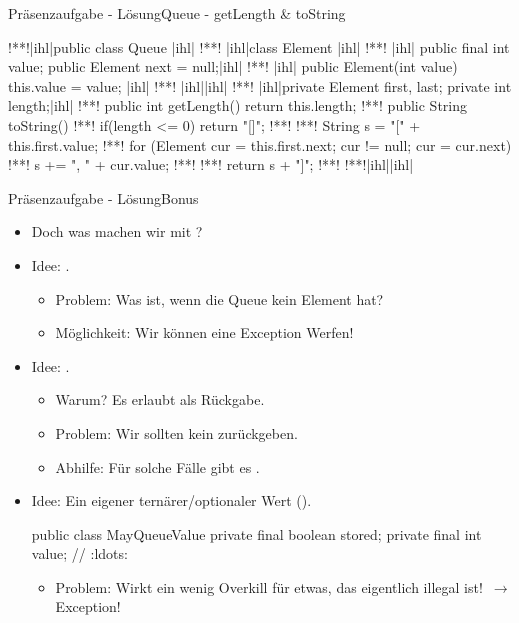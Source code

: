 \begin{frame}[c,fragile]{Präsenzaufgabe - Lösung\hfill Queue - getLength \& toString}
\SetupLstHl{}
\begin{plainjava}
!**!|ihl|public class Queue {|ihl|
!**!    |ihl|class Element {|ihl|
!**!    |ihl|    public final int value;  public Element next = null;|ihl|
!**!    |ihl|    public Element(int value) { this.value = value; }|ihl|
!**!    |ihl|}|ihl|
!**!    |ihl|private Element first, last;   private int length;|ihl|
!**!    public int getLength() { return this.length; }
!**!    public String toString() {
!**!        if(length <= 0) return "[]";
!**!
!**!        String s = "[" + this.first.value;
!**!        for (Element cur = this.first.next; cur != null; cur = cur.next) {
!**!            s += ", " + cur.value;
!**!        }
!**!        return s + "]";
!**!    }
!**!|ihl|}|ihl|
\end{plainjava}
\end{frame}

\begin{frame}[c,fragile]{Präsenzaufgabe - Lösung\hfill Bonus}
\begin{itemize}[<+(1)->]
    \itemsep9pt
    \item Doch was machen wir mit ?
    \item Idee: . \begin{itemize}
        \item Problem: Was ist, wenn die Queue kein Element hat?
        \item Möglichkeit: Wir können eine Exception Werfen!
    \end{itemize}
    \item Idee: . \begin{itemize}
        \item Warum? Es erlaubt  als Rückgabe.
        \item Problem: Wir sollten kein  zurückgeben.
        \item Abhilfe: Für solche Fälle gibt es .
    \end{itemize}
    \item Idee: Ein eigener ternärer/optionaler Wert ().
\begin{plainjava}
public class MayQueueValue {
    private final boolean stored;  private final int value;
    // :ldots:
}
    \end{plainjava}
    \begin{itemize}
        \item Problem: Wirkt ein wenig Overkill für etwas, das eigentlich illegal ist!~\(\longrightarrow\) Exception!
    \end{itemize}
\end{itemize}
\end{frame}

